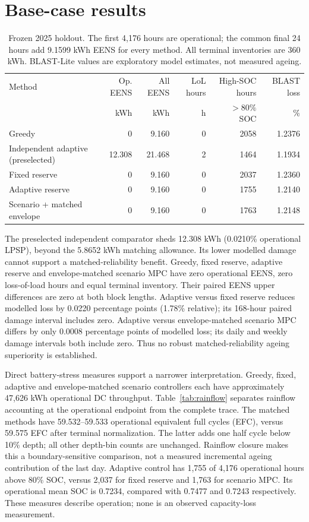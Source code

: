 \documentclass[journal]{IEEEtran}
\begin{document}
\section{Base-case results}
\begin{table}[t]
\centering\small
\begin{tabular}{lrrrrr}
\toprule
Method & Op. EENS & All EENS & LoL hours & High-SOC hours & BLAST loss \\
 & kWh & kWh & h & $>80\%$ SOC & \% \\
\midrule
Greedy & 0 & 9.160 & 0 & 2058 & 1.2376 \\
Independent adaptive (preselected) & 12.308 & 21.468 & 2 & 1464 & 1.1934 \\
Fixed reserve & 0 & 9.160 & 0 & 2037 & 1.2360 \\
Adaptive reserve & 0 & 9.160 & 0 & 1755 & 1.2140 \\
Scenario + matched envelope & 0 & 9.160 & 0 & 1763 & 1.2148 \\
\bottomrule
\end{tabular}
\caption{Frozen 2025 holdout. The first 4,176 hours are operational; the common final 24 hours add 9.1599 kWh EENS for every method. All terminal inventories are 360 kWh. BLAST-Lite values are exploratory model estimates, not measured ageing.}
\end{table}

The preselected independent comparator sheds 12.308 kWh (0.0210\% operational LPSP), beyond the 5.8652 kWh matching allowance. Its lower modelled damage cannot support a matched-reliability benefit. Greedy, fixed reserve, adaptive reserve and envelope-matched scenario MPC have zero operational EENS, zero loss-of-load hours and equal terminal inventory. Their paired EENS upper differences are zero at both block lengths. Adaptive versus fixed reserve reduces modelled loss by 0.0220 percentage points (1.78\% relative); its 168-hour paired damage interval includes zero. Adaptive versus envelope-matched scenario MPC differs by only 0.0008 percentage points of modelled loss; its daily and weekly damage intervals both include zero. Thus no robust matched-reliability ageing superiority is established.

Direct battery-stress measures support a narrower interpretation. Greedy, fixed, adaptive and envelope-matched scenario controllers each have approximately 47,626 kWh operational DC throughput. Table~\ref{tab:rainflow} separates rainflow accounting at the operational endpoint from the complete trace. The matched methods have 59.532--59.533 operational equivalent full cycles (EFC), versus 59.575 EFC after terminal normalization. The latter adds one half cycle below 10\% depth; all other depth-bin counts are unchanged. Rainflow closure makes this a boundary-sensitive comparison, not a measured incremental ageing contribution of the last day. Adaptive control has 1,755 of 4,176 operational hours above 80\% SOC, versus 2,037 for fixed reserve and 1,763 for scenario MPC. Its operational mean SOC is 0.7234, compared with 0.7477 and 0.7243 respectively. These measures describe operation; none is an observed capacity-loss measurement.
\end{document}

